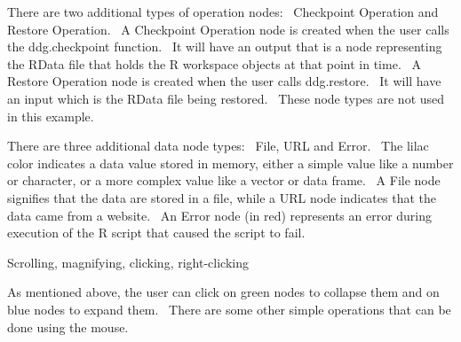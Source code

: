 \documentclass[letterpaper]{article}
\begin{document}
{\mdseries\upshape\color{black}
There are two additional types of operation nodes: \ Checkpoint Operation and Restore Operation. \ A Checkpoint Operation node is created when the user calls the ddg.checkpoint function. \ It will have an output that is a node representing the RData file that holds the R workspace objects at that point in time. \ A Restore Operation node is created when the user calls ddg.restore. \ It will have an input which is the RData file being restored. \ These node types are not used in this example.}

{\mdseries\upshape\color{black}
There are three additional data node types: \ File, URL and Error. \ The lilac color indicates a data value stored in memory, either a simple value like a number or character, or a more complex value like a vector or data frame. \ A File node signifies that the data are stored in a file, while a URL node indicates that the data came from a website. \ An Error node (in red) represents an error during execution of the R script that caused the script to fail.}

{\color{black}
Scrolling, magnifying, clicking, right-clicking}

{\mdseries\upshape\color{black}
As mentioned above, the user can click on green nodes to collapse them and on blue nodes to expand them. \ There are some other simple operations that can be done using the mouse.}
\end{document}
